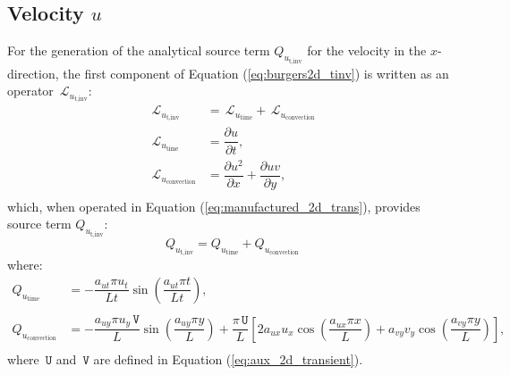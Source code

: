 \documentclass[10pt]{article}
\newcommand{\diff}[2] {\dfrac{\partial #1}{\partial #2}}
\newcommand{\Lo}{\,\mathcal{L}}
\newcommand{\U}{\,\mathtt{U}}
\newcommand{\V}{\,\mathtt{V}}
\begin{document}
\subsection{Velocity $u$}

For the generation of the analytical source term $Q_{u_\text{t,inv}}$ for the velocity in the $x$-direction, the first component of Equation  (\ref{eq:burgers2d_tinv}) is written as an  operator $\Lo_{u_\text{t,inv}}$:
\begin{equation*}
 \label{eq:burgers2d_14}
\begin{split}
\Lo_{u_\text{t,inv}}&= \Lo_{u_\text{time}}+\Lo_{u_\text{convection}}\\
\Lo_{u_\text{time}}&=\diff{ u}{t},\\
\Lo_{u_\text{convection}}&= \diff{ u^2 }{x}+\diff{uv}{y},\\
\end{split}
\end{equation*}
which, when operated in Equation (\ref{eq:manufactured_2d_trans}), provides source term $Q_{u_\text{t,inv}}$:
$$Q_{u_\text{t,inv}}= Q_{u_\text{time}}+Q_{u_\text{convection}}$$
where:
\begin{equation}
\begin{split}
Q_{u_\text{time}} &= - \dfrac{a_{ut} \pi u_t }{Lt}\sin\left(\dfrac{a_{ut} \pi t}{Lt}\right), \\  
%
&\\
%
Q_{u_\text{convection}} &= -\dfrac{a_{uy} \pi u_y \V}{L} \sin\left(\dfrac{a_{uy} \pi y}{L}\right)+\dfrac{\pi \U}{L}\left[2 a_{ux} u_x \cos\left(\dfrac{a_{ux} \pi x}{L}\right)+a_{vy} v_y \cos\left(\dfrac{a_{vy} \pi y}{L}\right)\right] , \\  
\end{split}
\end{equation}
where $\U$ and $\V$ are defined in Equation (\ref{eq:aux_2d_transient}).
\end{document}
